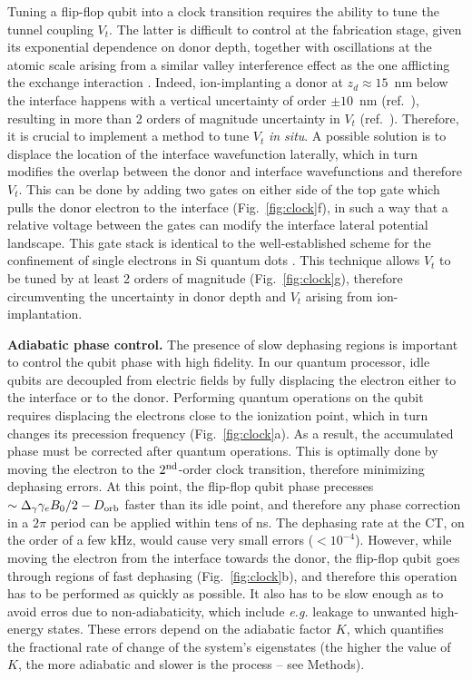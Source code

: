 \documentclass[aps,prb,superscriptaddress,nobibnotes,twocolumn]{revtex4-1}
\begin{document}
Tuning a flip-flop qubit into a clock transition requires the ability to tune the tunnel coupling $V_t$. The latter is difficult to control at the fabrication stage, given its exponential dependence on donor depth, together with oscillations at the atomic scale \cite{Calderon2008} arising from a similar valley interference effect as the one afflicting the exchange interaction \cite{Koiller2002}. Indeed, ion-implanting a donor at $z_d \approx 15$~nm below the interface happens with a vertical uncertainty of order $\pm 10$~nm (ref.~), resulting in more than 2 orders of magnitude uncertainty in $V_t$ (ref.~). Therefore, it is crucial to implement a method to tune $V_t$ \emph{in situ}. A possible solution is to displace the location of the interface wavefunction laterally, which in turn modifies the overlap between the donor and interface wavefunctions and therefore $V_t$. This can be done by adding two gates on either side of the top gate which pulls the donor electron to the interface (Fig.~\ref{fig:clock}f), in such a way that a relative voltage between the gates can modify the interface lateral potential landscape. This gate stack is identical to the well-established scheme for the confinement of single electrons in Si quantum dots \cite{Veldhorst2014}. This technique allows $V_t$ to be tuned by at least 2 orders of magnitude (Fig.~\ref{fig:clock}g), therefore circumventing the uncertainty in donor depth and $V_t$ arising from ion-implantation.


\vspace{3mm}
\noindent\textbf{Adiabatic phase control.} The presence of slow dephasing regions is important to control the qubit phase with high fidelity. In our quantum processor, idle qubits are decoupled from electric fields by fully displacing the electron either to the interface or to the donor. Performing quantum operations on the qubit requires displacing the electrons close to the ionization point, which in turn changes its precession frequency (Fig.~\ref{fig:clock}a). As a result, the accumulated phase must be corrected after quantum operations. This is optimally done by moving the electron to the $2^{\rm nd}$-order clock transition, therefore minimizing dephasing errors. At this point, the flip-flop qubit phase precesses $\sim\Delta_\gamma\gamma_e B_0/2-D_{\rm orb}$ faster than its idle point, and therefore any phase correction in a $2\pi$ period can be applied within tens of ns. The dephasing rate at the CT, on the order of a few kHz, would cause very small errors ($<10^{-4}$). However, while moving the electron from the interface towards the donor, the flip-flop qubit goes through regions of fast dephasing (Fig.~\ref{fig:clock}b), and therefore this operation has to be performed as quickly as possible. It also has to be slow enough as to avoid erros due to non-adiabaticity, which include \textit{e.g.} leakage to unwanted high-energy states. These errors depend on the adiabatic factor $K$, which quantifies the fractional rate of change of the system's eigenstates (the higher the value of $K$, the more adiabatic and slower is the process -- see Methods).
\end{document}
